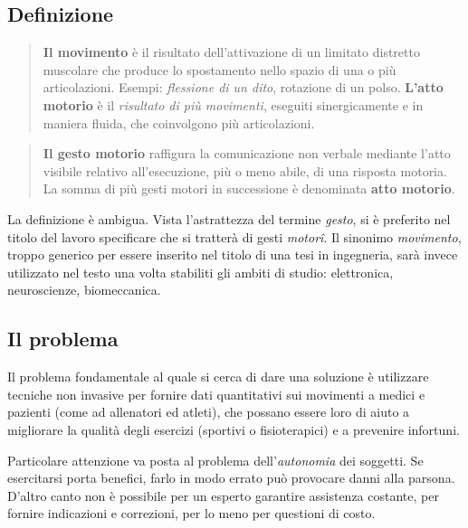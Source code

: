 
	\subsection{Definizione} \label{ssez:definizione}

\begin{quotation}
	\textbf{Il movimento} è il risultato dell'attivazione
	di un limitato distretto muscolare che produce lo spostamento nello spazio
	di una o più articolazioni.
	Esempi: \emph{flessione di un dito}, rotazione di un polso.
	\textbf{L'atto motorio} è il \emph{risultato di più movimenti},
	eseguiti sinergicamente e in maniera fluida, che coinvolgono più articolazioni. 
\cite{cit:mandolesi}
\end{quotation} 

\begin{quotation}
	\textbf{Il gesto motorio} raffigura la comunicazione non verbale
	mediante l'atto visibile relativo all'esecuzione,
	più o meno abile, di una risposta motoria.
	La somma di più gesti motori in successione è denominata \textbf{atto motorio}.
\cite{cit:lestini}
\end{quotation}

La definizione è ambigua.
Vista l'astrattezza del termine \emph{gesto},
si è preferito nel titolo del lavoro specificare che si tratterà di gesti \emph{motor\^i}.
Il sinonimo \emph{movimento},
troppo generico per essere inserito nel titolo di una tesi in ingegneria,
sarà invece utilizzato nel testo
una volta stabiliti gli ambiti di studio: elettronica, neuroscienze, biomeccanica.





	\subsection{Il problema}

Il problema fondamentale al quale si cerca di dare una soluzione
è utilizzare tecniche non invasive per fornire dati quantitativi sui movimenti
a medici e pazienti (come ad allenatori ed atleti),
che possano essere loro di aiuto a migliorare la qualità degli esercizi
(sportivi o fisioterapici)
e a prevenire infortuni.

Particolare attenzione va posta al problema dell'\emph{autonomia} dei soggetti.
Se esercitarsi porta benefici, farlo in modo errato può provocare danni alla parsona.
D'altro canto non è possibile per un esperto garantire assistenza costante,
per fornire indicazioni e correzioni, per lo meno per questioni di costo.

